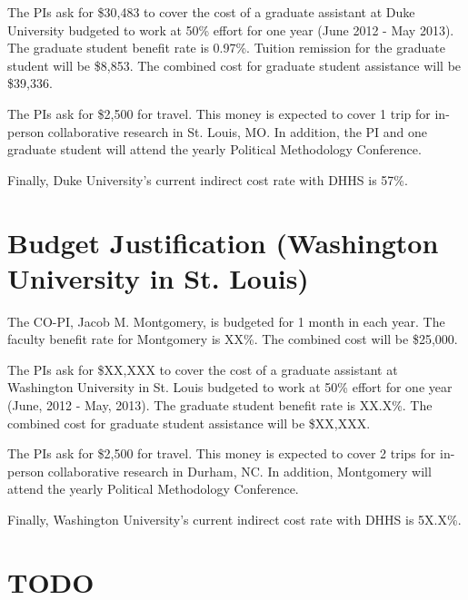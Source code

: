 \documentclass[pdftex,12pt,fullpage,oneside]{amsart}
\begin{document}
The PIs ask for \$30,483 to cover the cost of a graduate assistant at
Duke University budgeted to work at 50\% effort for one year (June
2012 - May 2013).  The graduate student benefit rate is 0.97\%.  Tuition remission
for the graduate student will be \$8,853. The
combined cost for graduate student assistance will be \$39,336.

The PIs ask for \$2,500 for travel.  This money is expected to cover 1
trip for in-person collaborative research in St. Louis, MO.  In addition,
the PI and one graduate student will attend the yearly Political
Methodology Conference.

Finally, Duke University's current indirect cost rate with DHHS is 57\%.


\newpage
\setcounter{page}{1}
\thispagestyle{empty}

\section*{Budget Justification (Washington University in St. Louis)}

The CO-PI, Jacob M. Montgomery, is budgeted for 1 month in each year.  The
faculty benefit rate for Montgomery is XX\%.   The combined cost will
be \$25,000.

The PIs ask for \$XX,XXX to cover the cost of a graduate assistant at
Washington University in St. Louis budgeted to work at 50\% effort for one year
(June, 2012 - May, 2013).  The graduate student benefit rate is
XX.X\%.  The combined cost for graduate student assistance will be
\$XX,XXX.

The PIs ask for \$2,500 for travel.  This money is expected to cover 2
trips for in-person collaborative research in Durham, NC.  In
addition, Montgomery will attend the yearly Political Methodology
Conference.

Finally, Washington University's current indirect cost rate with DHHS is 5X.X\%.

\newpage
\setcounter{page}{1}
\section*{TODO}
\end{document}
